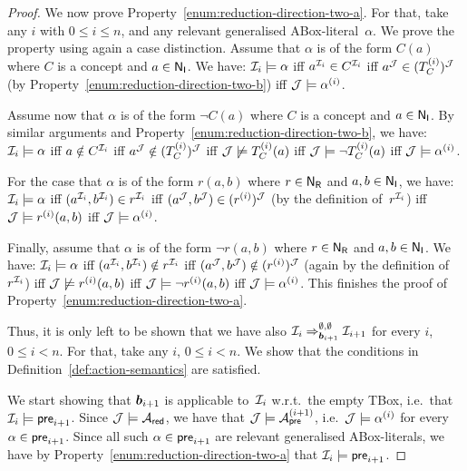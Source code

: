 \begin{proof}
    We now prove Property~\eqref{enum:reduction-direction-two-a}.  For that,
    take any $i$ with $0\le i\le n$, and any relevant generalised
    ABox-literal~$\alpha$.  We prove the property using again a case
    distinction.
    Assume that $\alpha$ is of the form $C(a)$ where $C$ is a concept and
    $a\in\mathsf{N_I}$.  We have: $\mathcal{I}_i\models\alpha$ iff $a^{\mathcal{I}_i}\in C^{\mathcal{I}_i}$
    iff $a^\mathcal{J}\in(T_C^{(i)})^\mathcal{J}$ (by
    Property~\eqref{enum:reduction-direction-two-b}) iff
    $\mathcal{J}\models\alpha^{(i)}$.

    Assume now that $\alpha$ is of the form $\lnot C(a)$ where $C$ is a concept
    and $a\in\mathsf{N_I}$.  By similar arguments and
    Property~\eqref{enum:reduction-direction-two-b}, we have:
    $\mathcal{I}_i\models\alpha$ iff $a\notin C^{\mathcal{I}_i}$ iff
    $a^\mathcal{J}\notin(T_C^{(i)})^\mathcal{J}$ iff $\mathcal{J}\not\models T_C^{(i)}(a)$ iff
    $\mathcal{J}\models\lnot T_C^{(i)}(a)$ iff $\mathcal{J}\models\alpha^{(i)}$.

    For the case that $\alpha$ is of the form $r(a,b)$ where $r\in\mathsf{N_R}$ and
    $a,b\in\mathsf{N_I}$, we have: $\mathcal{I}_i\models\alpha$ iff
    $(a^{\mathcal{I}_i},b^{\mathcal{I}_i})\in r^{\mathcal{I}_i}$ iff
    $(a^\mathcal{J},b^\mathcal{J})\in(r^{(i)})^\mathcal{J}$ (by the definition of~$r^{\mathcal{I}_i}$) iff
    $\mathcal{J}\models r^{(i)}(a,b)$ iff $\mathcal{J}\models\alpha^{(i)}$.

    Finally, assume that $\alpha$ is of the form $\lnot r(a,b)$ where $r\in\mathsf{N_R}$
    and $a,b\in\mathsf{N_I}$.  We have: $\mathcal{I}_i\models\alpha$ iff
    $(a^{\mathcal{I}_i},b^{\mathcal{I}_i})\notin r^{\mathcal{I}_i}$ iff
    $(a^\mathcal{J},b^\mathcal{J})\notin(r^{(i)})^\mathcal{J}$ (again by the definition
    of~$r^{\mathcal{I}_i}$) iff $\mathcal{J}\not\models r^{(i)}(a,b)$ iff
    $\mathcal{J}\models\lnot r^{(i)}(a,b)$ iff $\mathcal{J}\models\alpha^{(i)}$.
    This finishes the proof of Property~\eqref{enum:reduction-direction-two-a}.

    Thus, it is only left to be shown that we have also
    $\mathcal{I}_i\Rightarrow_{\boldsymbol b_{i+1}}^{\emptyset,\emptyset}\mathcal{I}_{i+1}$ for every
    $i$, $0\le i<n$.
    For that, take any $i$, $0\le i<n$.  We show that the conditions in
    Definition~\ref{def:action-semantics} are satisfied.

    We start showing that $\boldsymbol b_{i+1}$ is applicable to~$\mathcal{I}_i$ w.r.t.\ the
    empty TBox, i.e.~that $\mathcal{I}_i\models\mathsf{pre}_{i+1}$.  Since $\mathcal{J}\models\mathcal{A}_\mathsf{red}$,
    we have that $\mathcal{J}\models\mathcal{A}_\mathsf{pre}^{(i+1)}$, i.e.~$\mathcal{J}\models\alpha^{(i)}$ for
    every $\alpha\in\mathsf{pre}_{i+1}$.  Since all such $\alpha\in\mathsf{pre}_{i+1}$ are
    relevant generalised ABox-literals, we have by
    Property~\eqref{enum:reduction-direction-two-a} that
    $\mathcal{I}_i\models\mathsf{pre}_{i+1}$.


\end{proof}
